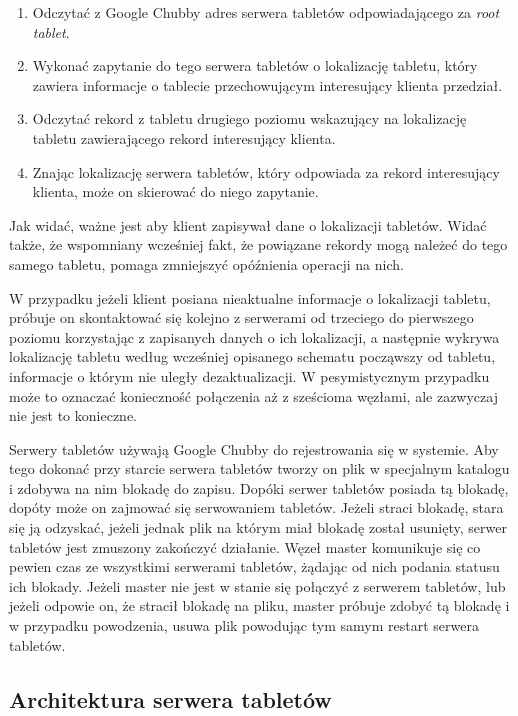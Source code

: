\begin{enumerate}
 \item Odczytać z Google Chubby adres serwera tabletów odpowiadającego za \emph{root tablet}.
 \item Wykonać zapytanie do tego serwera tabletów o lokalizację tabletu, który zawiera informacje o tablecie przechowującym interesujący klienta przedział.
 \item Odczytać rekord z tabletu drugiego poziomu wskazujący na lokalizację tabletu zawierającego rekord interesujący klienta.
 \item Znając lokalizację serwera tabletów, który odpowiada za rekord interesujący klienta, może on skierować do niego zapytanie.
\end{enumerate}

Jak widać, ważne jest aby klient zapisywał dane o lokalizacji tabletów.
Widać także, że wspomniany wcześniej fakt, że powiązane rekordy mogą należeć do tego samego tabletu, pomaga zmniejszyć opóźnienia operacji na nich.

W przypadku jeżeli klient posiana nieaktualne informacje o lokalizacji tabletu, próbuje on skontaktować się kolejno z serwerami od trzeciego do pierwszego poziomu korzystając z zapisanych danych o ich lokalizacji, a następnie wykrywa lokalizację tabletu według wcześniej opisanego schematu począwszy od tabletu, informacje o którym nie uległy dezaktualizacji.
W pesymistycznym przypadku może to oznaczać konieczność połączenia aż z sześcioma węzłami, ale zazwyczaj nie jest to konieczne.

Serwery tabletów używają Google Chubby do rejestrowania się w systemie.
Aby tego dokonać przy starcie serwera tabletów tworzy on plik w specjalnym katalogu i zdobywa na nim blokadę do zapisu.
Dopóki serwer tabletów posiada tą blokadę, dopóty może on zajmować się serwowaniem tabletów.
Jeżeli straci blokadę, stara się ją odzyskać, jeżeli jednak plik na którym miał blokadę został usunięty, serwer tabletów jest zmuszony zakończyć działanie.
Węzeł master komunikuje się co pewien czas ze wszystkimi serwerami tabletów, żądając od nich podania statusu ich blokady.
Jeżeli master nie jest w stanie się połączyć z serwerem tabletów, lub jeżeli odpowie on, że stracił blokadę na pliku, master próbuje zdobyć tą blokadę i w przypadku powodzenia, usuwa plik powodując tym samym restart serwera tabletów.

\subsection*{Architektura serwera tabletów}

